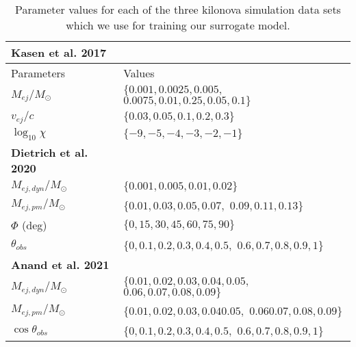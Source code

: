 \documentclass[fleqn,usenatbib,useAMS]{mnras}
\begin{document}
\begin{table}
\caption{Parameter values for each of the three kilonova simulation data sets which we use for training our surrogate model.  }
\begin{tabularx}{\linewidth}{LL} 

\hline \hline
\textbf{Kasen et al. 2017}         &                                                             \\ \hline 
Parameters                & Values                                                     \\ \hline
$M_{ej} / M_{\odot}$      & $\{ 0.001, 0.0025, 0.005,$ $0.0075, 0.01, 0.25, 0.05, 0.1 \}$ \\
$v_{ej} / c $             & $\{ 0.03, 0.05, 0.1, 0.2, 0.3\}$                            \\
$\log_{10} \chi $         & $ \{ -9, -5, -4, -3, -2, -1 \}$                             \\ \hline

\textbf{Dietrich et al. 2020 }     &                                                             \\ \hline 

$M_{ej, dyn} / M_{\odot}$ & $\{0.001, 0.005,  0.01, 0.02\}$                             \\
$M_{ej, pm} / M_{\odot}$  & $\{0.01, 0.03, 0.05, 0.07, $ $0.09, 0.11, 0.13\}$              \\
$\Phi$ (deg)              & $\{ 0, 15, 30, 45, 60, 75, 90\}$                            \\
$\theta_{obs}$            & $\{ 0, 0.1, 0.2, 0.3, 0.4, 0.5,$ $0.6, 0.7, 0.8, 0.9, 1 \}$   \\ \hline
\textbf{Anand et al. 2021}         &                                                             \\ \hline

$M_{ej, dyn} / M_{\odot}$ & $\{0.01, 0.02, 0.03,0.04,0.05,$ $0.06, 0.07,0.08, 0.09\}$       \\
$M_{ej, pm} / M_{\odot}$  & $\{0.01, 0.02, 0.03,0.04 0.05,$ $0.06 0.07,0.08,0.09\} $       \\
$\cos \theta_{obs}$       & $\{ 0, 0.1, 0.2, 0.3, 0.4, 0.5, $ $0.6, 0.7, 0.8, 0.9, 1 \}$   \\
\hline \hline
\end{tabularx}
\label{table:params}
\end{table}


\end{document}

